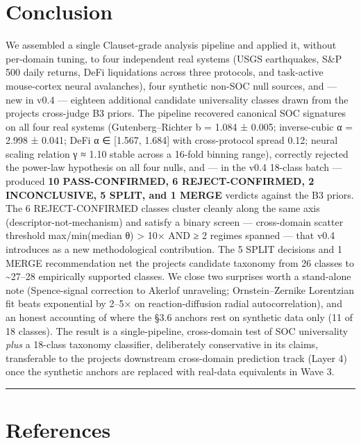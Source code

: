\documentclass[
  11pt]{article}
\begin{document}
\section{Conclusion}\label{sec:7}

We assembled a single Clauset-grade analysis pipeline and applied it,
without per-domain tuning, to four independent real systems (USGS
earthquakes, S\&P 500 daily returns, DeFi liquidations across three
protocols, and task-active mouse-cortex neural avalanches), four
synthetic non-SOC null sources, and --- new in v0.4 --- eighteen
additional candidate universality classes drawn from the
project\textquotesingle s cross-judge B3 priors. The pipeline recovered
canonical SOC signatures on all four real systems (Gutenberg--Richter
b = 1.084 ± 0.005; inverse-cubic α = 2.998 ± 0.041; DeFi α ∈
{[}1.567, 1.684{]} with cross-protocol spread 0.12; neural scaling
relation γ ≈ 1.10 stable across a 16-fold binning range), correctly
rejected the power-law hypothesis on all four nulls, and --- in the
v0.4 18-class batch --- produced \textbf{10 PASS-CONFIRMED,
6 REJECT-CONFIRMED, 2 INCONCLUSIVE, 5 SPLIT, and 1 MERGE} verdicts
against the B3 priors. The 6 REJECT-CONFIRMED classes cluster cleanly
along the same axis (descriptor-not-mechanism) and satisfy a binary
screen --- cross-domain scatter threshold max/min(median θ) > 10× AND ≥ 2
regimes spanned --- that v0.4 introduces as a new methodological
contribution. The 5 SPLIT decisions and 1 MERGE recommendation net the
project\textquotesingle s candidate taxonomy from 26 classes to
\textasciitilde 27--28 empirically supported classes. We close two
surprises worth a stand-alone note (Spence-signal correction to Akerlof
unraveling; Ornstein--Zernike Lorentzian fit beats exponential by 2--5×
on reaction-diffusion radial autocorrelation), and an honest accounting
of where the §3.6 anchors rest on synthetic data only (11 of 18
classes). The result is a single-pipeline, cross-domain test of SOC
universality \emph{plus} a 18-class taxonomy classifier, deliberately
conservative in its claims, transferable to the project\textquotesingle s
downstream cross-domain prediction track (Layer 4) once the synthetic
anchors are replaced with real-data equivalents in Wave 3.

\begin{center}\rule{0.5\linewidth}{0.5pt}\end{center}

\section*{References}\label{references}
\end{document}
